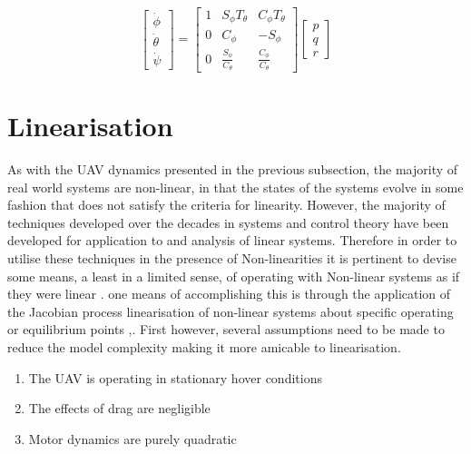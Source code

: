 \documentclass[12pt,a4paper,twoside]{report}
\begin{document}
			$$
				\begin{bmatrix}
				\dot{\phi} \\
				\dot{\theta} \\
				\dot{\psi}
				\end{bmatrix}
				=
				\begin{bmatrix}
				1 & S_\phi T_\theta & C_\phi T_\theta \\
				0 & C_\phi & -S_\phi\\
				0 & \frac{S_\phi}{C_\theta}  & \frac{C_\phi}{C_\theta}
				\end{bmatrix}
				\begin{bmatrix}
				p \\
				q \\
				r 
				\end{bmatrix}
			$$ 
		
		\newpage
		
		\section{Linearisation}
				
			As with the UAV dynamics presented in the previous subsection, the majority of real world systems are non-linear, in that the states of the systems evolve in some fashion that does not satisfy the criteria for linearity. However, the majority of techniques developed over the decades in systems and control theory have been developed for application to and analysis of linear systems. Therefore in order to utilise these techniques in the presence of Non-linearities it is pertinent to devise some means, a least in a limited sense, of operating with Non-linear systems as if they were linear \cite{11}. one means of accomplishing this is through the application of the Jacobian process linearisation of non-linear systems about specific operating or equilibrium points \cite{11},\cite{18}. First however, several assumptions need to be made to reduce the model complexity making it more amicable to linearisation. 
				
			\begin{enumerate}
				\item 
					The UAV is operating in stationary hover conditions
				\item 
					The effects of drag are negligible
				\item 
					Motor dynamics are purely quadratic
			\end{enumerate}
\end{document}
